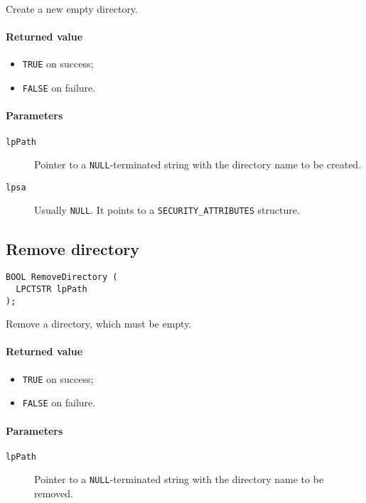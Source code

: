 Create a new empty directory.

\paragraph{Returned value}
\begin{itemize}
\item \texttt{TRUE} on success;
\item \texttt{FALSE} on failure.
\end{itemize}

\paragraph{Parameters}
\begin{description}
\item [\texttt{lpPath}] Pointer to a \texttt{NULL}-terminated string with the directory name to be created.
\item [\texttt{lpsa}] Usually \texttt{NULL}. It points to a \texttt{SECURITY\_ATTRIBUTES} structure.
\end{description}

\subsection{Remove directory}
\begin{verbatim}
BOOL RemoveDirectory (
  LPCTSTR lpPath
);
\end{verbatim}

Remove a directory, which must be empty.

\paragraph{Returned value}
\begin{itemize}
\item \texttt{TRUE} on success;
\item \texttt{FALSE} on failure.
\end{itemize}

\paragraph{Parameters}
\begin{description}
\item [\texttt{lpPath}] Pointer to a \texttt{NULL}-terminated string with the directory name to be removed.
\end{description}

